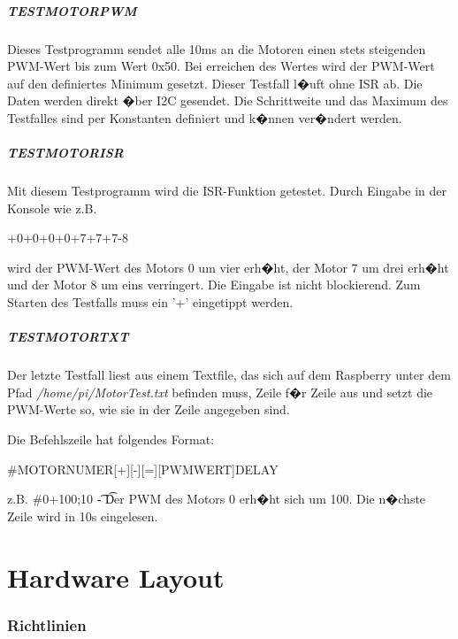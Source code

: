 \subparagraph{TESTMOTORPWM}

Dieses Testprogramm sendet alle 10ms an die Motoren einen stets steigenden PWM-Wert bis zum Wert 0x50. Bei erreichen des Wertes wird der PWM-Wert auf den definiertes Minimum gesetzt. Dieser Testfall l�uft ohne ISR ab. Die Daten werden direkt �ber I2C gesendet. Die Schrittweite und das Maximum des Testfalles sind per Konstanten definiert und k�nnen ver�ndert werden. 

\subparagraph{TESTMOTORISR}

Mit diesem Testprogramm wird die ISR-Funktion getestet. Durch Eingabe in der Konsole wie z.B.

+0+0+0+0+7+7+7-8

wird der  PWM-Wert des Motors 0 um vier erh�ht, der Motor 7 um drei erh�ht und der Motor 8 um eins verringert. Die Eingabe ist nicht blockierend. Zum Starten des Testfalls muss ein '+' eingetippt werden.

\subparagraph{TESTMOTORTXT}

Der letzte Testfall liest aus einem Textfile, das sich auf dem Raspberry unter dem Pfad \emph{/home/pi/MotorTest.txt} befinden muss, Zeile f�r Zeile aus und setzt die PWM-Werte so, wie sie in der Zeile angegeben sind.

Die Befehlszeile hat folgendes Format:
\newline
\begin{center}
\#MOTORNUMER[+][-][=][PWMWERT]\;DELAY
\end{center}
z.B.
\#0+100;10 \t - \t Der PWM des Motors 0 erh�ht sich um 100. Die n�chste Zeile wird in 10s eingelesen.



\section{Hardware Layout}



\newpage



\subsubsection{Richtlinien\cite{doc:guidelinesSchematics}}

